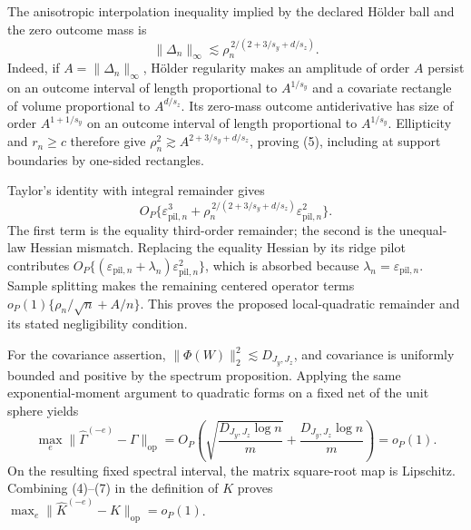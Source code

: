 The anisotropic interpolation inequality implied by the declared H\"older ball and the zero outcome mass is
\[
\|\Delta_n\|_\infty
\lesssim \rho_n^{\,2/(2+3/s_y+d/s_z)}.                 \tag{5}
\]
Indeed, if \(A=\|\Delta_n\|_\infty\), H\"older regularity makes an amplitude of order \(A\) persist on an outcome interval of length proportional to \(A^{1/s_y}\) and a covariate rectangle of volume proportional to \(A^{d/s_z}\). Its zero-mass outcome antiderivative has size of order \(A^{1+1/s_y}\) on an outcome interval of length proportional to \(A^{1/s_y}\). Ellipticity and \(r_n\ge c\) therefore give \(\rho_n^2\gtrsim A^{2+3/s_y+d/s_z}\), proving (5), including at support boundaries by one-sided rectangles.

Taylor's identity with integral remainder gives
\[
O_P\{\varepsilon_{\mathrm{pil},n}^3+
\rho_n^{\,2/(2+3/s_y+d/s_z)}
\varepsilon_{\mathrm{pil},n}^2\}.                       \tag{6}
\]
The first term is the equality third-order remainder; the second is the unequal-law Hessian mismatch. Replacing the equality Hessian by its ridge pilot contributes \(O_P\{(\varepsilon_{\mathrm{pil},n}+\lambda_n)\varepsilon_{\mathrm{pil},n}^2\}\), which is absorbed because \(\lambda_n=\varepsilon_{\mathrm{pil},n}\). Sample splitting makes the remaining centered operator terms \(o_P(1)\{\rho_n/\sqrt n+A/n\}\). This proves the proposed local-quadratic remainder and its stated negligibility condition.

For the covariance assertion, \(\|\Phi(W)\|_2^2\lesssim D_{J_y,J_z}\), and covariance is uniformly bounded and positive by the spectrum proposition. Applying the same exponential-moment argument to quadratic forms on a fixed net of the unit sphere yields
\[
\max_e\|\widehat\Gamma^{(-e)}-\Gamma\|_{\mathrm{op}}
=O_P\!\left(\sqrt{\frac{D_{J_y,J_z}\log n}{m}}+
\frac{D_{J_y,J_z}\log n}{m}\right)=o_P(1).            \tag{7}
\]
On the resulting fixed spectral interval, the matrix square-root map is Lipschitz. Combining (4)--(7) in the definition of \(K\) proves \(\max_e\|\widehat K^{(-e)}-K\|_{\mathrm{op}}=o_P(1)\).